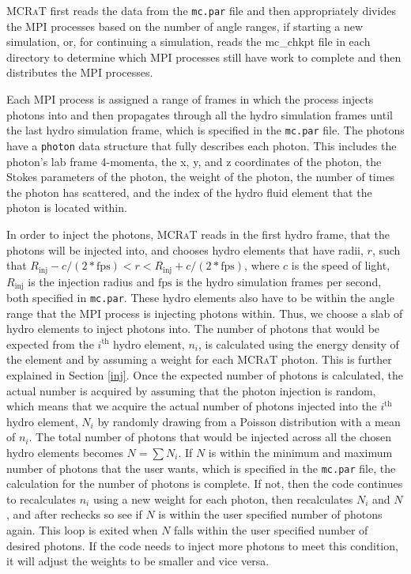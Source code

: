 \documentclass[12pt,a4paper]{article}
\newcommand{\mcrat}{\textsc{MCRaT}}
\begin{document}
\mcrat{} first reads the data from the \texttt{mc.par} file and then appropriately divides the MPI processes based on the number of angle ranges, if starting a new simulation, or, for continuing a simulation, reads the mc\_chkpt file in each directory to determine which MPI processes still have work to complete and then distributes the MPI processes. 

Each MPI process is assigned a range of frames in which the process injects photons into and then propagates through all the hydro simulation frames until the last hydro simulation frame, which is specified in the \texttt{mc.par} file. The photons have a \texttt{photon} data structure that fully describes each photon. This includes the photon's lab frame 4-momenta, the x, y, and z coordinates of the photon, the Stokes parameters of the photon, the weight of the photon, the number of times the photon has scattered, and the index of the hydro fluid element that the photon is located within.

In order to inject the photons, \mcrat{} reads in the first hydro frame, that the photons will be injected into, and chooses hydro elements that have radii, $r$, such that $R_\mathrm{inj}-c/(2*\mathrm{fps}) < r < R_\mathrm{inj}+c/(2*\mathrm{fps})$, where $c$ is the speed of light, $R_\mathrm{inj}$ is the injection radius and $\mathrm{fps}$ is the hydro simulation frames per second, both specified in \texttt{mc.par}. These hydro elements also have to be within the angle range that the MPI process is injecting photons within. Thus, we choose a slab of hydro elements to inject photons into. The number of photons that would be expected from the $i^\mathrm{th}$ hydro element, $n_i$, is calculated using the energy density of the element and by assuming a weight for each \mcrat{} photon. This is further explained in Section \ref{inj}. Once the expected number of photons is calculated, the actual number is acquired by assuming that the photon injection is random, which means that we acquire the actual number of photons injected into the $i^\mathrm{th}$ hydro element, $N_i$ by randomly drawing from a Poisson distribution with a mean of $n_i$. The total number of photons that would be injected across all the chosen hydro elements becomes $N=\sum N_i$. If $N$ is within the minimum and maximum number of photons that the user wants, which is specified in the \texttt{mc.par} file, the calculation for the number of photons is complete. If not, then the code continues to recalculates $n_i$ using a new weight for each photon, then recalculates $N_i$ and $N$, and after rechecks so see if $N$ is within the user specified number of photons again. This loop is exited when $N$ falls within the user specified number of desired photons. If the code needs to inject more photons to meet this condition, it will adjust the weights to be smaller and vice versa.
\end{document}
